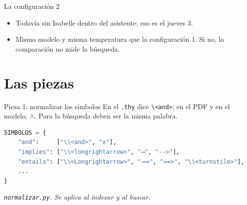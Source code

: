 \documentclass[10pt]{beamer}
\newcommand{\nota}[1]{{\small\itshape\color{psCom} #1}}
\newcommand{\cd}[1]{\texttt{#1}}
\begin{document}
\begin{frame}{La configuración 2}
  \begin{center}
  \end{center}
  \begin{itemize}
    \item Todavía \alert{sin} Isabelle dentro del asistente: eso es el
      jueves 3.
    \item Mismo modelo y misma temperatura que la configuración 1. Si no,
      la comparación no mide la búsqueda.
  \end{itemize}
\end{frame}

\section{Las piezas}

\begin{frame}[fragile]{Pieza 1: normalizar los símbolos}
  En el \cd{.thy} dice \cd{\textbackslash<and>}; en el PDF y en el modelo,
  $\wedge$. Para la búsqueda deben ser la misma palabra.
\begin{lstlisting}[language=Python]
SIMBOLOS = {
    "and":     ["\\<and>", "∧"],
    "implies": ["\\<longrightarrow>", "⟶", "-->"],
    "entails": ["\\<Longrightarrow>", "⟹", "==>", "\\<turnstile>"],
    ...
}
\end{lstlisting}
  \nota{\cd{normalizar.py}. Se aplica al indexar \emph{y} al buscar.}
\end{frame}
\end{document}
